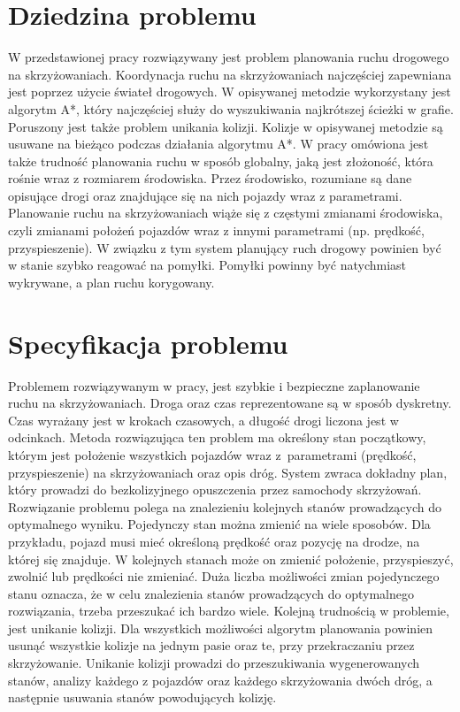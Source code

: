 
\section{Dziedzina problemu}

W przedstawionej pracy rozwiązywany jest problem planowania ruchu drogowego na skrzyżowaniach. Koordynacja ruchu na skrzyżowaniach najczęściej zapewniana jest poprzez użycie świateł drogowych. W opisywanej metodzie wykorzystany jest algorytm A*, który najczęściej służy do wyszukiwania najkrótszej ścieżki w grafie. Poruszony jest także problem unikania kolizji. Kolizje w opisywanej metodzie są usuwane na bieżąco podczas działania algorytmu A*.
\newline
\indent
W pracy omówiona jest także trudność planowania ruchu w sposób globalny, jaką jest złożoność, która rośnie wraz z rozmiarem środowiska. Przez środowisko, rozumiane są dane opisujące drogi oraz znajdujące się na nich pojazdy wraz z parametrami. Planowanie ruchu na skrzyżowaniach wiąże się z częstymi zmianami środowiska, czyli zmianami położeń pojazdów wraz z innymi parametrami (np. prędkość, przyspieszenie). W związku z tym system planujący ruch drogowy powinien być w stanie szybko reagować na pomyłki. Pomyłki powinny być natychmiast wykrywane, a plan ruchu korygowany.

\section{Specyfikacja problemu}

Problemem rozwiązywanym w pracy, jest szybkie i bezpieczne zaplanowanie ruchu na skrzyżowaniach. Droga oraz czas reprezentowane są w sposób dyskretny. Czas wyrażany jest w krokach czasowych, a długość drogi liczona jest w odcinkach. Metoda rozwiązująca ten problem ma określony stan początkowy, którym jest położenie wszystkich pojazdów wraz z~parametrami (prędkość, przyspieszenie) na skrzyżowaniach oraz opis dróg. System zwraca dokładny plan, który prowadzi do bezkolizyjnego opuszczenia przez samochody skrzyżowań. Rozwiązanie problemu polega na znalezieniu kolejnych stanów prowadzących do optymalnego wyniku. Pojedynczy stan można zmienić na wiele sposobów. Dla przykładu, pojazd musi mieć określoną prędkość oraz pozycję na drodze, na której się znajduje. W kolejnych stanach może on zmienić położenie, przyspieszyć, zwolnić lub prędkości nie zmieniać. Duża liczba możliwości zmian pojedynczego stanu oznacza, że w celu znalezienia stanów prowadzących do optymalnego rozwiązania, trzeba przeszukać ich bardzo wiele.
\newline
\indent
Kolejną trudnością w problemie, jest unikanie kolizji. Dla wszystkich możliwości algorytm planowania powinien usunąć wszystkie kolizje na jednym pasie oraz te, przy przekraczaniu przez skrzyżowanie. Unikanie kolizji prowadzi do przeszukiwania wygenerowanych stanów, analizy każdego z pojazdów oraz każdego skrzyżowania dwóch dróg, a następnie usuwania stanów powodujących kolizję.

